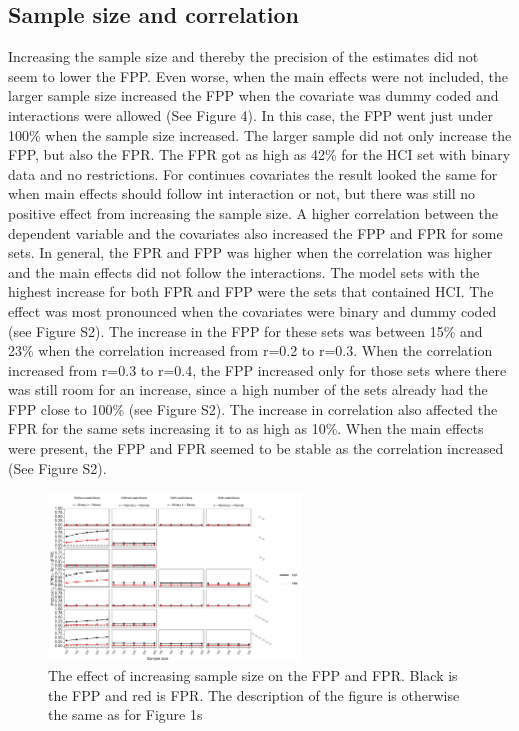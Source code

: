 \subsection{Sample size and correlation}
Increasing the sample size and thereby the precision of the estimates did not seem to lower the FPP. Even worse, when the main effects were not included, the larger sample size increased the FPP when the covariate was dummy coded and interactions were allowed (See Figure 4). In this case, the FPP went just under 100\% when the sample size increased. The larger sample did not only increase the FPP, but also the FPR. The FPR got as high as 42\% for the HCI set with binary data and no restrictions. For continues covariates the result looked the same for when main effects should follow int interaction or not, but there was still no positive effect from increasing the sample size. 
A higher correlation between the dependent variable and the covariates also increased the FPP and FPR for some sets. In general, the FPR and FPP was higher when the correlation was higher and the main effects did not follow the interactions. The model sets with the highest increase for both FPR and FPP were the sets that contained HCI. The effect was most pronounced when the covariates were binary and dummy coded (see Figure S2). The increase in the FPP for these sets was between 15\% and 23\% when the correlation increased from r=0.2 to r=0.3. When the correlation increased from r=0.3 to r=0.4, the FPP increased only for those sets where there was still room for an increase, since a high number of the sets already had the FPP close to 100\% (see Figure S2). The increase in correlation also affected the FPR for the same sets increasing it to as high as 10\%. When the main effects were present, the FPP and FPR seemed to be stable as the correlation increased (See Figure S2).

\begin{figure}[t]
\includegraphics[width=0.6\textwidth]{R/Analysis/Result/Figures/Figure1D.jpeg}
\centering
\caption{The effect of increasing sample size on the FPP and FPR. Black is the FPP and red is FPR. The description of the figure is otherwise the same as for Figure 1s}
\label{fig:mainfigure}
\end{figure}

